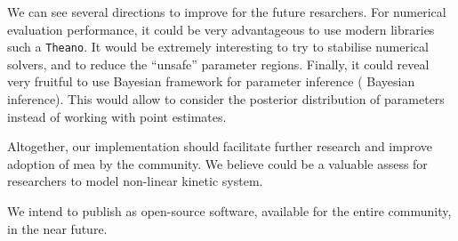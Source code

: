 We can see several directions to improve \means{} for the future resarchers.
For numerical evaluation performance, it could be very
advantageous to use modern libraries such a \texttt{Theano}\cite{bergstra_theano:_2010}.
It would be extremely interesting to try to stabilise numerical solvers, and to reduce the ``unsafe'' parameter regions.
Finally, it could reveal very fruitful to use Bayesian framework for parameter inference (\ie{} Bayesian inference).
This would allow to consider the posterior distribution of parameters instead of working with point estimates.

Altogether, our implementation should facilitate further research and improve adoption of \acrlong{mea} by the community.
We believe \means{} could be a valuable assess for researchers to model non-linear kinetic system.

 
We intend to publish \means{} as open-source software, available for the entire community, in the near future. 

